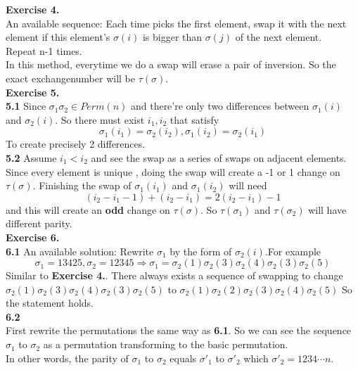 \documentclass{article}
\begin{document}
\textbf{Exercise 4.}\\

An available sequence: Each time picks the first element, swap it with the next element if this element's $\sigma(i)$ is bigger than $\sigma(j)$ of the next element.\\
Repeat n-1 times.\\
In this method, everytime we do a swap will erase a pair of inversion. So the exact exchangenumber will be $\tau(\sigma)$.\\

\textbf{Exercise 5.}\\

\textbf{5.1} Since $\sigma_1\sigma_2 \in Perm(n)$ and there're only two differences between $\sigma_1(i)$ and $\sigma_2(i)$.
So there must exist $i_1,i_2$ that satisfy 
\[
\sigma_1(i_1)=\sigma_2(i_2) , \sigma_1(i_2)=\sigma_2(i_1)
\]
To create precisely 2 differences.\\

\textbf{5.2} Assume $i_1<i_2$ and see the swap as a series of swaps on adjacent elements. Since every element is unique , doing the swap will create a -1 or 1 change on $\tau(\sigma)$.
 Finishing the swap of $\sigma_1(i_1)$ and $\sigma_1(i_2)$ will need \[
 (i_2-i_1-1)+(i_2-i_1)=2(i_2-i_1)-1
 \]
 and this will create an \textbf{odd} change on $\tau(\sigma)$. So $\tau(\sigma_1)$ and $\tau(\sigma_2)$ will have different parity.\\

\textbf{Exercise 6.}\\

\textbf{6.1} 
An available solution: Rewrite $\sigma_1$ by the form of $\sigma_2(i)$.For example
\[
\sigma_1 = 13425 , \sigma_2=12345 \Rightarrow \sigma_1=\sigma_2(1)\sigma_2(3)\sigma_2(4)\sigma_2(3)\sigma_2(5)
\]
Similar to \textbf{Exercise 4.}. There always exists a sequence of swapping to change $\sigma_2(1)\sigma_2(3)\sigma_2(4)\sigma_2(3)\sigma_2(5)$ to $\sigma_2(1)\sigma_2(2)\sigma_2(3)\sigma_2(4)\sigma_2(5)$
So the statement holds.\\ 

\textbf{6.2}\\

First rewrite the permutations the same way as \textbf{6.1}. 
So we can see the sequence $\sigma_1$ to $\sigma_2$ as a permutation transforming to the basic permutation.\\
In other words, the parity of $\sigma_1$ to $\sigma_2$ equals $\sigma'_1$ to $\sigma'_2$ which $\sigma'_2=1234\cdots n$.\\
\end{document}
